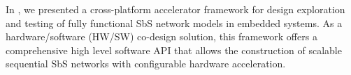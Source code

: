 In \cite{nevarez2020accelerator}, we presented a cross-platform accelerator framework for design exploration and testing of fully functional SbS network models in embedded systems. As a hardware/software (HW/SW) co-design solution, this framework offers a comprehensive high level software API that allows the construction of scalable sequential SbS networks with configurable hardware acceleration.
